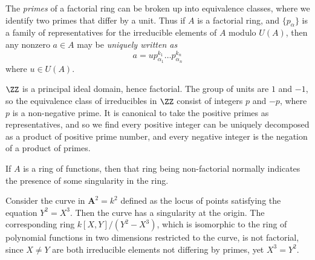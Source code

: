 The {\it primes} of a factorial ring can be broken up into equivalence classes, where we identify two primes that differ by a unit. Thus if $A$ is a factorial ring, and $\{ p_\alpha \}$ is a family of representatives for the irreducible elements of $A$ modulo $U(A)$, then any nonzero $a \in A$ may be \emph{uniquely written as}
%
\[ a = u p_{\alpha_1}^{k_1} \dots p_{\alpha_n}^{k_n} \]
%
where $u \in U(A)$.

\begin{example}
    $\ZZ$ is a principal ideal domain, hence factorial. The group of units are $1$ and $-1$, so the equivalence class of irreducibles in $\ZZ$ consist of integers $p$ and $-p$, where $p$ is a non-negative prime. It is canonical to take the positive primes as representatives, and so we find every positive integer can be uniquely decomposed as a product of positive prime number, and every negative integer is the negation of a product of primes.
\end{example}

If $A$ is a ring of functions, then that ring being non-factorial normally indicates the presence of some singularity in the ring.

\begin{example}
    Consider the curve in $\mathbf{A}^2 = k^2$ defined as the locus of points satisfying the equation $Y^2 = X^3$. Then the curve has a singularity at the origin. The corresponding ring $k[X,Y]/(Y^2 - X^3)$, which is isomorphic to the ring of polynomial functions in two dimensions restricted to the curve, is not factorial, since $X \neq Y$ are both irreducible elements not differing by primes, yet $X^3 = Y^2$.
\end{example}


